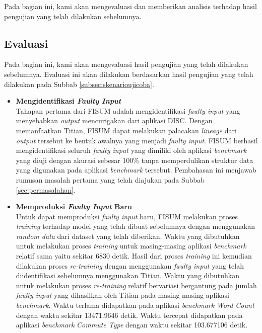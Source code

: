 Pada bagian ini, kami akan mengevaluasi dan memberikan analisis
terhadap hasil pengujian yang telah dilakukan sebelumnya.

\subsection{Evaluasi}
\label{subsec:evaluasi}

Pada bagian ini, kami akan mengevaluasi hasil pengujian yang telah
dilakukan sebelumnya. Evaluasi ini akan dilakukan berdasarkan
hasil pengujian yang telah dilakukan pada Subbab \ref{subsec:skenarioujicoba}.

\begin{itemize}
      \item \textbf{Mengidentifikasi \emph{Faulty Input}} \\
      Tahapan pertama dari FISUM adalah mengidentifikasi \emph{faulty input}
      yang menyebabkan \emph{output} mencurigakan dari aplikasi DISC.
      Dengan memanfaatkan Titian, FISUM dapat melakukan palacakan
      \emph{lineage} dari \emph{output} tersebut ke bentuk awalnya yang
      menjadi \emph{faulty input}. FISUM berhasil mengidentifikasi
      seluruh \emph{faulty input} yang dimiliki oleh aplikasi 
      \emph{benchmark} yang diuji dengan akurasi sebesar 100\% 
      tanpa memperdulikan struktur data yang digunakan pada aplikasi
      \emph{benchmark} tersebut. Pembahasan ini menjawab rumusan masalah
      pertama yang telah diajukan pada Subbab \ref{sec:permasalahan}.

      \item \textbf{Memproduksi \emph{Faulty Input} Baru} \\
      Untuk dapat memproduksi \emph{faulty input} baru, FISUM melakukan
      proses \emph{training} terhadap model yang telah dibuat sebelumnya
      dengan menggunakan \emph{random data} dari dataset yang telah
      diberikan. 
      Waktu yang dibutuhkan untuk melakukan proses \emph{training}
      untuk masing-masing aplikasi \emph{benchmark} relatif sama
      yaitu sekitar 6830 detik.
      Hasil dari proses \emph{training} ini kemudian
      dilakukan proses \emph{re-training} dengan menggunakan \emph{faulty input}
      yang telah diidentifikasi sebelumnya menggunakan Titian.
      Waktu yang dibutuhkan untuk melakukan proses \emph{re-training}
      relatif bervariasi bergantung pada jumlah \emph{faulty input}
      yang dihasilkan oleh Titian pada masing-masing aplikasi \emph{benchmark}.
      Waktu terlama didapatkan pada aplikasi \emph{benchmark} \emph{Word Count}
      dengan waktu sekitar 13471.9646 detik. Waktu tercepat didapatkan pada
      aplikasi \emph{benchmark} \emph{Commute Type} dengan waktu sekitar
      103.677106 detik.


\end{itemize}
